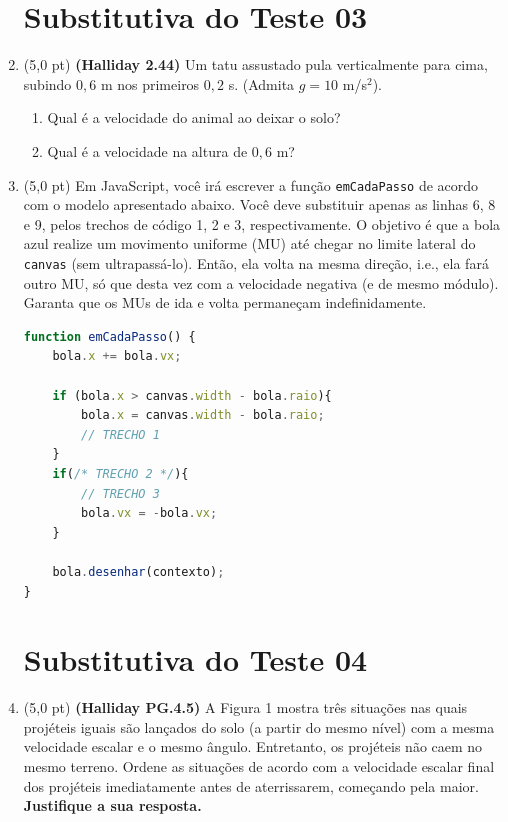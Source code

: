 \documentclass[12pt,a4paper,oneside]{article}
\begin{document}
\begin{enumerate}
	
	\section*{Substitutiva do Teste 03}

\item (5,0 pt) {\bf (Halliday 2.44)} Um tatu assustado pula verticalmente para cima, subindo $0,6$ m nos primeiros $0,2$ s. (Admita $g= 10$ m/s$^2$).
\begin{enumerate}
	\item Qual é a velocidade do animal ao deixar o solo?
	\item Qual é a velocidade na altura de $0,6$ m?
\end{enumerate}	 
	
	
	\item (5,0 pt) Em JavaScript, você irá escrever a função {\tt emCadaPasso} de acordo com o modelo apresentado abaixo. Você deve substituir apenas as linhas 6, 8 e 9, pelos trechos de código 1, 2 e 3, respectivamente. O objetivo é que a bola azul realize um movimento uniforme (MU) até chegar no limite lateral do {\tt canvas} (sem ultrapassá-lo). Então, ela volta na mesma direção, i.e., ela fará outro MU, só que desta vez com a velocidade negativa (e de mesmo módulo). Garanta que os MUs de ida e volta permaneçam indefinidamente.
	
	\begin{lstlisting}[language=JavaScript]
function emCadaPasso() {    
	bola.x += bola.vx; 
	
	if (bola.x > canvas.width - bola.raio){ 
		bola.x = canvas.width - bola.raio; 
		// TRECHO 1
	}
	if(/* TRECHO 2 */){
		// TRECHO 3
		bola.vx = -bola.vx;
	}
	
	bola.desenhar(contexto); 
}\end{lstlisting}
	
	\newpage
	
	\section*{Substitutiva do Teste 04}
	
		\item (5,0 pt) {\bf (Halliday PG.4.5)} A Figura 1 mostra três situações nas quais projéteis iguais são lançados do solo (a partir do mesmo nível) com a mesma velocidade escalar e o mesmo ângulo. Entretanto, os projéteis não caem no mesmo terreno. Ordene as situações de acordo com a velocidade escalar final dos projéteis imediatamente antes de aterrissarem, começando pela maior. {\bf Justifique a sua resposta.}
	

\end{enumerate}
\end{document}
